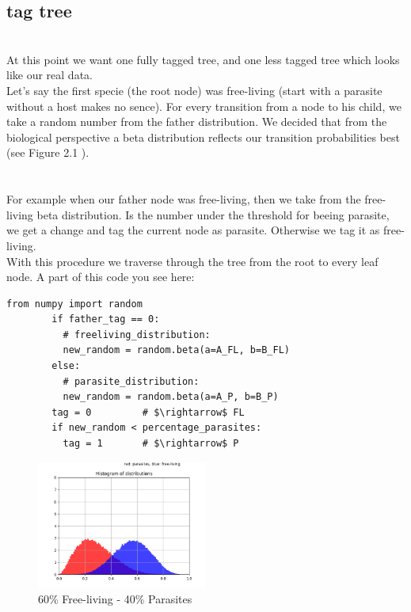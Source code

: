     \subsection{tag tree}
       \\
      At this point we want one fully tagged tree, and one less tagged tree which looks like our real 
        data.\\
      Let's say the first specie (the root node) was free-living (start with a parasite without a host 
        makes no sence). For every transition from a node to his child, we take a random number from
        the father distribution. We decided that from the biological perspective a beta distribution
        reflects our transition probabilities best (see Figure 2.1 ). \\
       \\
       \\
      For example when our father node was free-living, then we take from the free-living beta
        distribution. Is the number under the threshold for beeing parasite, we get a change and tag
        the current node as parasite. Otherwise we tag it as free-living. \\
      With this procedure we traverse through the tree from the root to every leaf node. A part of
        this code you see here:
      \begin{lstlisting}[gobble=6]
        from numpy import random
        if father_tag == 0:
          # freeliving_distribution:
          new_random = random.beta(a=A_FL, b=B_FL)
        else:
          # parasite_distribution:
          new_random = random.beta(a=A_P, b=B_P)
        tag = 0         # $\rightarrow$ FL
        if new_random < percentage_parasites:
          tag = 1       # $\rightarrow$ P
      \end{lstlisting}
      \begin{figure}
        \caption{60\% Free-living - 40\% Parasites}
        \centering
          \includegraphics[width=0.5\textwidth]{Figures/40-60.png}
      \end{figure}
